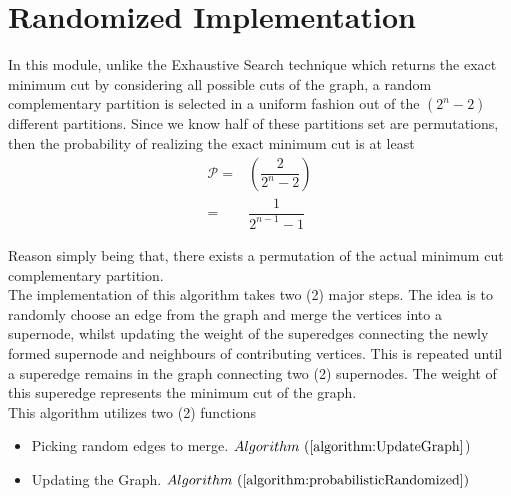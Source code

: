 \documentclass[longpaper, english, final, times]{revdetua}
\begin{document}
	\section{\label{outline:randomized} Randomized Implementation}
		In this module, unlike the Exhaustive Search technique which returns the exact minimum cut by considering all possible cuts of the graph, a random complementary partition is selected in a uniform fashion out of the $(2^n-2)$ different partitions. Since we know half of these partitions set are permutations, then the probability of realizing the exact minimum cut is at least 
		\begin{align*}
			\mathcal{P}=&\left(\dfrac{2}{2^n-2}\right) \\
			=&\dfrac{1}{2^{n-1}-1}
		\end{align*}
		 
		Reason simply being that, there exists a permutation of the actual minimum cut complementary partition.\\
		
		The implementation of this algorithm takes two (2) major steps. The idea is to randomly choose an edge from the graph and merge the vertices into a supernode, whilst updating the weight of the superedges connecting the newly formed supernode and neighbours of contributing vertices. This is repeated until a superedge remains in the graph connecting two (2) supernodes. The weight of this superedge represents the minimum cut of the graph.\\
		
		This algorithm utilizes two (2) functions
		\begin{itemize}
			\item Picking random edges to merge. $Algorithm\text{ }(\ref{algorithm:UpdateGraph}$)
			\item Updating the Graph. $Algorithm \text{ }(\ref{algorithm:probabilisticRandomized})$
		\end{itemize}
	
		
\end{document}
